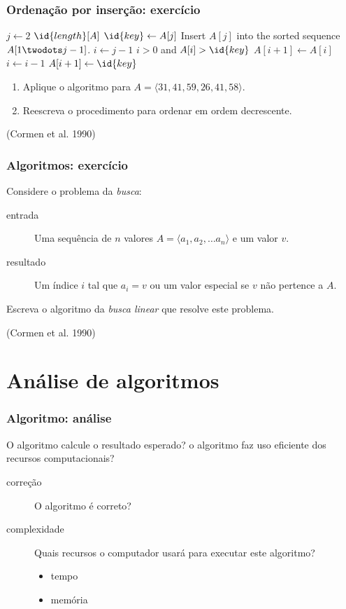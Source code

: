 \documentclass{beamer}
\begin{document}
\begin{frame}

  \frametitle{Ordenação por inserção: exercício}

\begin{codebox}
\li \For $j \gets 2$ \To $\id{length}[A]$
\li     \Do
$\id{key} \gets A[j]$
\li
\Comment Insert $A[j]$ into the sorted sequence
    $A[1 \twodots j-1]$.
\li $i \gets j-1$
\li \While $i > 0$ and $A[i] > \id{key}$
\li    \Do
        $A[i+1] \gets A[i]$
\li     $i \gets i-1$
    \End
\li $A[i+1] \gets \id{key}$
\End
\end{codebox}  

\begin{enumerate}
\item Aplique o algoritmo para $A = \langle 31, 41, 59, 26, 41, 58 \rangle$.
\item Reescreva o procedimento  para ordenar em ordem
  decrescente.
\end{enumerate}
(Cormen et al. 1990)

\end{frame}

\begin{frame}

  \frametitle{Algoritmos: exercício}

Considere o problema da \emph{busca}:

\begin{description}
\item[entrada] Uma sequência de $n$ valores $A = \langle a_1, a_2, \ldots a_n \rangle$
e um valor $v$.
\item[resultado] Um índice $i$ tal que $a_i = v$ ou um valor especial  se $v$ não pertence a $A$.
\end{description}

Escreva o algoritmo da \emph{busca linear} que resolve este problema.

(Cormen et al. 1990)

\end{frame}

\section{Análise de algoritmos}

\begin{frame}

  \frametitle{Algoritmo: análise}

  O algoritmo calcule o resultado esperado? o algoritmo faz uso eficiente dos
  recursos computacionais?
  \begin{description}
  \item[correção] O algoritmo é correto? 
  \item[complexidade] Quais recursos o computador usará para executar este
    algoritmo?
    \begin{itemize}
    \item tempo
    \item memória
    \end{itemize}
  \end{description}

\end{frame}
\end{document}
